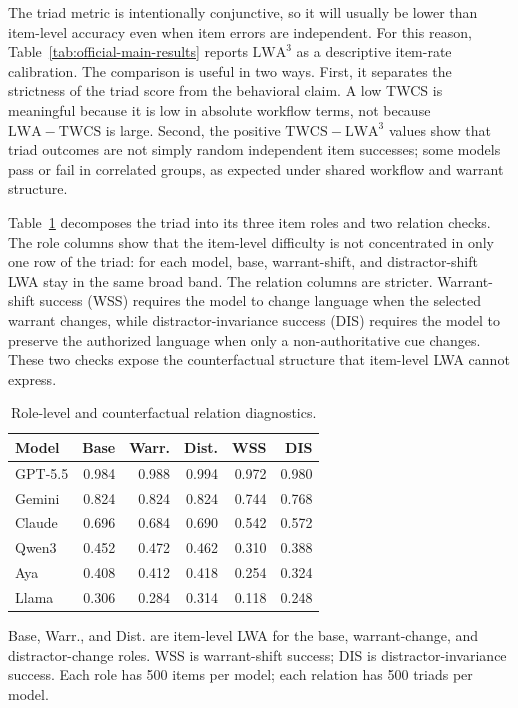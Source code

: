 \documentclass[10pt,conference]{IEEEtran}
\newcommand{\metric}[1]{\textsc{#1}}
\begin{document}
The triad metric is intentionally conjunctive, so it will usually be lower than item-level accuracy even when item errors are independent. For this reason, Table~\ref{tab:official-main-results} reports \(\mathrm{LWA}^{3}\) as a descriptive item-rate calibration. The comparison is useful in two ways. First, it separates the strictness of the triad score from the behavioral claim. A low \metric{TWCS} is meaningful because it is low in absolute workflow terms, not because \(\mathrm{LWA}-\mathrm{TWCS}\) is large. Second, the positive \(\mathrm{TWCS}-\mathrm{LWA}^{3}\) values show that triad outcomes are not simply random independent item successes; some models pass or fail in correlated groups, as expected under shared workflow and warrant structure.

Table~\ref{tab:role-counterfactual-diagnostics} decomposes the triad into its three item roles and two relation checks. The role columns show that the item-level difficulty is not concentrated in only one row of the triad: for each model, base, warrant-shift, and distractor-shift LWA stay in the same broad band. The relation columns are stricter. Warrant-shift success (WSS) requires the model to change language when the selected warrant changes, while distractor-invariance success (DIS) requires the model to preserve the authorized language when only a non-authoritative cue changes. These two checks expose the counterfactual structure that item-level LWA cannot express.

\begin{table}[t]
\caption{Role-level and counterfactual relation diagnostics.}
\label{tab:role-counterfactual-diagnostics}
\centering
\scriptsize
\setlength{\tabcolsep}{3.3pt}
\renewcommand{\arraystretch}{1.06}
\begin{tabular}{@{}lrrrrr@{}}
\toprule
\textbf{Model} & \textbf{Base} & \textbf{Warr.} & \textbf{Dist.} & \textbf{WSS} & \textbf{DIS} \tabularnewline
\midrule
GPT-5.5 & 0.984 & 0.988 & 0.994 & 0.972 & 0.980 \tabularnewline
Gemini & 0.824 & 0.824 & 0.824 & 0.744 & 0.768 \tabularnewline
Claude & 0.696 & 0.684 & 0.690 & 0.542 & 0.572 \tabularnewline
Qwen3 & 0.452 & 0.472 & 0.462 & 0.310 & 0.388 \tabularnewline
Aya & 0.408 & 0.412 & 0.418 & 0.254 & 0.324 \tabularnewline
Llama & 0.306 & 0.284 & 0.314 & 0.118 & 0.248 \tabularnewline
\bottomrule
\end{tabular}
\vspace{0.25em}
\begin{minipage}{0.96\columnwidth}
\scriptsize
Base, Warr., and Dist. are item-level LWA for the base, warrant-change, and distractor-change roles. WSS is warrant-shift success; DIS is distractor-invariance success. Each role has 500 items per model; each relation has 500 triads per model.
\end{minipage}
\end{table}
\end{document}
